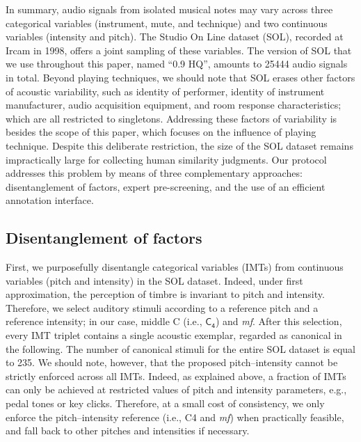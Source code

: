 \documentclass{bmcart}
\makeatletter
\newcommand*{\eg}{e.g.,\@\xspace}
\newcommand*{\ie}{i.e.,\@\xspace}
\makeatother
\begin{document}
In summary, audio signals from isolated musical notes may vary across three categorical variables (instrument, mute, and technique) and two continuous variables (intensity and pitch).
The Studio On Line dataset (SOL), recorded at Ircam in 1998, offers a joint sampling of these variables.
The version of SOL that we use throughout this paper, named ``0.9 HQ'', amounts to 25444 audio signals in total.
Beyond playing techniques, we should note that SOL erases other factors of acoustic variability, such as identity of performer, identity of instrument manufacturer, audio acquisition equipment, and room response characteristics; which are all restricted to singletons.
Addressing these factors of variability is besides the scope of this paper, which focuses on the influence of playing technique.
Despite this deliberate restriction, the size of the SOL dataset remains impractically large for collecting human similarity judgments.
Our protocol addresses this problem by means of three complementary approaches: disentanglement of factors, expert pre-screening, and the use of an efficient annotation interface.

\subsection*{Disentanglement of factors}
First, we purposefully disentangle categorical variables (IMTs) from continuous variables (pitch and intensity) in the SOL dataset.
Indeed, under first approximation, the perception of timbre is invariant to pitch and intensity.
Therefore, we select auditory stimuli according to a reference pitch and a reference intensity; in our case, middle C (\ie{} $\mathsf{C_4}$) and \emph{mf}.
After this selection, every IMT triplet contains a single acoustic exemplar, regarded as canonical in the following.
The number of canonical stimuli for the entire SOL dataset is equal to 235.
We should note, however, that the proposed pitch--intensity cannot be strictly enforced across all IMTs.
Indeed, as explained above, a fraction of IMTs can only be achieved at restricted values of pitch and intensity parameters, \eg{} pedal tones or key clicks.
Therefore, at a small cost of consistency, we only enforce the pitch--intensity reference (\ie{} C4 and \emph{mf}) when practically feasible, and fall back to other pitches and intensities if necessary.
\end{document}
